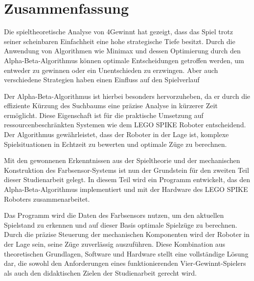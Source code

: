 \chapter{Zusammenfassung}


Die spieltheoretische Analyse von 4Gewinnt hat gezeigt, dass das Spiel trotz seiner scheinbaren Einfachheit eine hohe strategische Tiefe besitzt. Durch die Anwendung von Algorithmen wie Minimax und dessen Optimierung durch den Alpha-Beta-Algorithmus können optimale Entscheidungen getroffen werden, um entweder zu gewinnen oder ein Unentschieden zu erzwingen. Aber auch verschiedene Strategien haben einen Einfluss auf den Spielverlauf

Der Alpha-Beta-Algorithmus ist hierbei besonders hervorzuheben, da er durch die effiziente Kürzung des Suchbaums eine präzise Analyse in kürzerer Zeit ermöglicht. Diese Eigenschaft ist für die praktische Umsetzung auf ressourcenbeschränkten Systemen wie dem LEGO SPIKE Roboter entscheidend. Der Algorithmus gewährleistet, dass der Roboter in der Lage ist, komplexe Spielsituationen in Echtzeit zu bewerten und optimale Züge zu berechnen.

Mit den gewonnenen Erkenntnissen aus der Spieltheorie und der mechanischen Konstruktion des Farbsensor-Systems ist nun der Grundstein für den zweiten Teil dieser Studienarbeit gelegt. In diesem Teil wird ein Programm entwickelt, das den Alpha-Beta-Algorithmus implementiert und mit der Hardware des LEGO SPIKE Roboters zusammenarbeitet. 

Das Programm wird die Daten des Farbsensors nutzen, um den aktuellen Spielstand zu erkennen und auf dieser Basis optimale Spielzüge zu berechnen. Durch die präzise Steuerung der mechanischen Komponenten wird der Roboter in der Lage sein, seine Züge zuverlässig auszuführen. Diese Kombination aus theoretischen Grundlagen, Software und Hardware stellt eine vollständige Lösung dar, die sowohl den Anforderungen eines funktionierenden Vier-Gewinnt-Spielers als auch den didaktischen Zielen der Studienarbeit gerecht wird.
